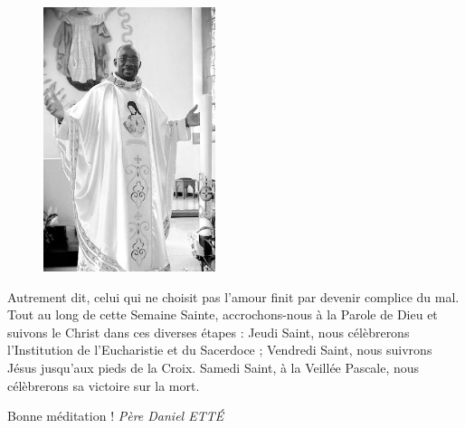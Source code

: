 \begin{figure}
\vspace{-0.5cm}
	\includegraphics{standing_daniel.png}
\end{figure}

Autrement dit,
celui qui ne choisit pas l’amour finit par devenir complice du
mal. Tout au long de cette Semaine Sainte, accrochons-nous
à la Parole de Dieu et suivons le Christ dans ces diverses
étapes : Jeudi Saint, nous célèbrerons l’Institution de
l’Eucharistie et du Sacerdoce ; Vendredi Saint, nous
suivrons Jésus jusqu’aux pieds de la Croix. Samedi Saint,
à la Veillée Pascale, nous célèbrerons sa victoire sur la mort.
\begin{flushright}
Bonne méditation !
\textit{Père  Daniel  ETTÉ}
\end{flushright}

